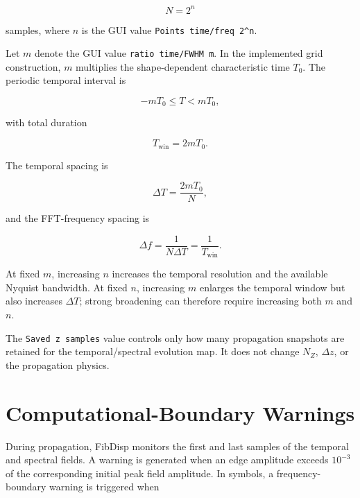 \documentclass[11pt,a4paper]{article}
\begin{document}
\begin{equation}
\boxed{N=2^n}
\end{equation}

samples, where $n$ is the GUI value \texttt{Points time/freq 2\^{}n}.

Let $m$ denote the GUI value \texttt{ratio time/FWHM m}. In the implemented
grid construction, $m$ multiplies the shape-dependent characteristic time
$T_0$. The periodic temporal interval is

\begin{equation}
\boxed{
-mT_0\le T<mT_0,
}
\end{equation}

with total duration

\begin{equation}
T_{\mathrm{win}}=2mT_0.
\end{equation}

The temporal spacing is

\begin{equation}
\boxed{
\Delta T=\frac{2mT_0}{N},
}
\end{equation}

and the FFT-frequency spacing is

\begin{equation}
\boxed{
\Delta f=\frac{1}{N\Delta T}
=\frac{1}{T_{\mathrm{win}}}.
}
\end{equation}

At fixed $m$, increasing $n$ increases the temporal resolution and the
available Nyquist bandwidth. At fixed $n$, increasing $m$ enlarges the temporal
window but also increases $\Delta T$; strong broadening can therefore require
increasing both $m$ and $n$.

The \texttt{Saved z samples} value controls only how many propagation snapshots
are retained for the temporal/spectral evolution map. It does not change
$N_Z$, $\Delta z$, or the propagation physics.

\section{Computational-Boundary Warnings}

During propagation, FibDisp monitors the first and last samples of the temporal
and spectral fields. A warning is generated when an edge amplitude exceeds
$10^{-3}$ of the corresponding initial peak field amplitude. In symbols, a
frequency-boundary warning is triggered when
\end{document}
